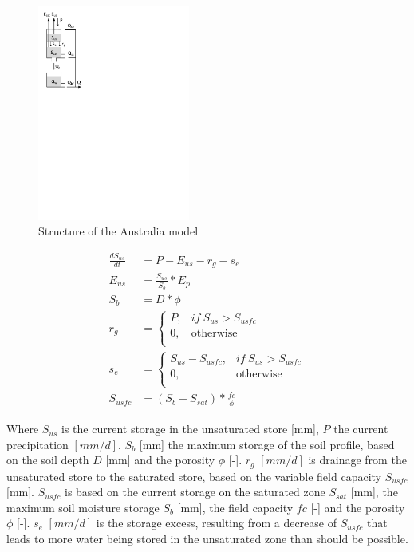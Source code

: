 { 																	%
\begin{figure}
\includegraphics[trim=1cm 18cm 14cm 0.8cm,width=5cm,keepaspectratio]{./files/19_schematic.pdf}
\caption{Structure of the Australia model} \label{fig:19_schematic}
\end{figure}

\begin{align}
	\frac{dS_{us}}{dt} &= P-E_{us}-r_g -s_e\\
	E_{us} &= \frac{S_{us}}{S_b}*E_p\\
	S_b &= D*\phi\\
	r_g &= 
	\begin{cases}
		P, & if~S_{us} > S_{usfc}\\
		0, & \text{otherwise} \\
	\end{cases} \\
	s_e &= \begin{cases}
			S_{us} - S_{usfc}, & if~S_{us} > S_{usfc}\\
			0, & \text{otherwise} \\
			\end{cases}\\
	S_{usfc} &= (S_b - S_{sat})*\frac{fc}{\phi} 
\end{align}

Where $S_{us}$ is the current storage in the unsaturated store [mm], $P$ the current precipitation $[mm/d]$, $S_b$ [mm] the maximum storage of the soil profile, based on the soil depth $D$ [mm] and the porosity $\phi$ [-]. $r_g$ $[mm/d]$ is drainage from the unsaturated store to the saturated store, based on the variable field capacity $S_{usfc}$ [mm]. $S_{usfc}$ is based on the current storage on the saturated zone $S_{sat}$ [mm], the maximum soil moisture storage $S_b$ [mm], the field capacity $fc$ [-] and the porosity $\phi$ [-]. $s_e$ $[mm/d]$ is the storage excess, resulting from a decrease of $S_{usfc}$ that leads to more water being stored in the unsaturated zone than should be possible.

} %

